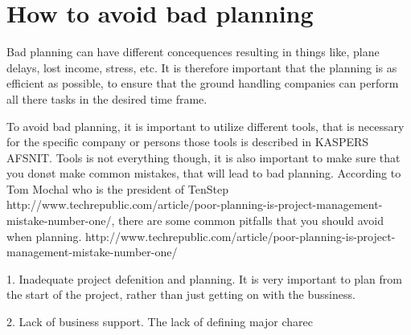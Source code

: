 \section{How to avoid bad planning}

Bad planning can have different concequences resulting in things like, plane delays, lost income, stress, etc. It is therefore important that the planning is as efficient as possible, to ensure that the ground handling companies can perform all there tasks in the desired time frame.

To avoid bad planning, it is important to utilize different tools, that is necessary for the specific company or persons those tools is described in KASPERS AFSNIT. Tools is not everything though, it is also important to make sure that you donøt make common mistakes, that will lead to bad planning. According to Tom Mochal who is the president of TenStep http://www.techrepublic.com/article/poor-planning-is-project-management-mistake-number-one/, there are some common pitfalls that you should avoid when planning. http://www.techrepublic.com/article/poor-planning-is-project-management-mistake-number-one/

1. Inadequate project defenition and planning. It is very important to plan from the start of the project, rather than just getting on with the bussiness.

2. Lack of business support. The lack of defining major charec